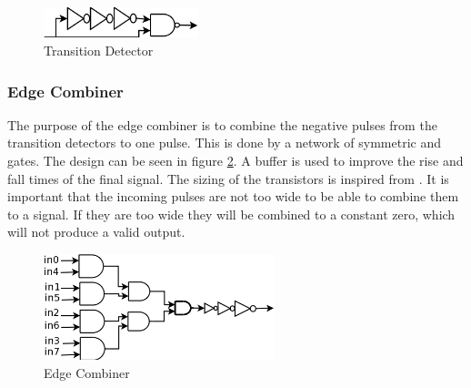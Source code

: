 \documentclass[a4paper,12pt]{article} \usepackage{graphicx}
\begin{document}
\begin{figure}[p]
        \centering
        \includegraphics[width=0.4\textwidth]{../Bilder/trans_detect.png}
        \caption{Transition Detector}
        \label{fig:trans_detect}
\end{figure}

\subsubsection{Edge Combiner}
The purpose of the edge combiner is to combine the negative pulses from the
transition detectors to one pulse. This is done by a network of symmetric and
gates. The design can be seen in figure \ref{fig:edge_comb}. A buffer is used to
improve the rise and fall times of the final signal.
The sizing of the transistors is inspired from \cite{dll_report}.
It is important that the incoming pulses are not too wide to be able to combine
them to a signal. If they are too wide they will be combined to a constant zero,
which will not produce a valid output.

\begin{figure}[p]
        \centering
        \includegraphics[width=0.6\textwidth]{../Bilder/edge_combiner_trans.png}
        \caption{Edge Combiner}
        \label{fig:edge_comb}
\end{figure}
\end{document}
